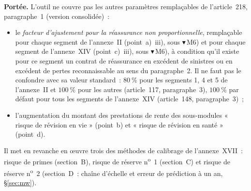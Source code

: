 \documentclass[a4paper,11pt]{article}
\begin{document}
\begin{encadre}
\textbf{Portée.} L'outil ne couvre pas les autres paramètres remplaçables
de l'article~218, paragraphe~1 (version consolidée)~:
\begin{itemize}
\item le \emph{facteur d'ajustement pour la réassurance non proportionnelle},
  remplaçable pour chaque segment de l'annexe~II (point~a)~iii), sous
  $\blacktriangledown$\,M6) et pour chaque segment de l'annexe~XIV
  (point~c)~iii), sous $\blacktriangledown$\,M6), à condition qu'il existe
  pour ce segment un contrat de réassurance en excédent de sinistres ou en
  excédent de pertes reconnaissable au sens du paragraphe~2. Il ne faut pas le
  confondre avec sa valeur standard~: $80~\%$ pour les segments 1, 4 et 5 de
  l'annexe~II et $100~\%$ pour les autres (article~117, paragraphe~3), $100~\%$
  par défaut pour tous les segments de l'annexe~XIV (article~148,
  paragraphe~3)~;
\item l'augmentation du montant des prestations de rente des sous-modules
  « risque de révision en vie » (point~b) et « risque de révision en santé »
  (point~d).
\end{itemize}
Il met en revanche en \oe uvre trois des méthodes de calibrage de
l'annexe~XVII~: risque de primes (section~B), risque de réserve
n\textsuperscript{o}~1 (section~C) et risque de réserve
n\textsuperscript{o}~2 (section~D~: chaîne d'échelle et erreur de prédiction à un
an, §\ref{sec:mw}).


\end{encadre}
\end{document}
